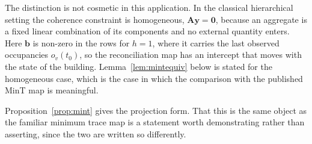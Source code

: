 \documentclass[11pt]{article}
\theoremstyle{plain}
\theoremstyle{definition}
\theoremstyle{remark}
\newcommand{\bA}{\bm{A}}
\newcommand{\by}{\bm{y}}
\newcommand{\bb}{\bm{b}}
\newif\ifrevisionmarkup
\newcommand{\new}[1]{\ifrevisionmarkup\textcolor{revision}{#1}\else#1\fi}
\begin{document}
\new{The distinction is not cosmetic in this application. In the classical hierarchical setting the coherence constraint is homogeneous, $\bA\by=\bm{0}$, because an aggregate is a fixed linear combination of its components and no external quantity enters. Here $\bb$ is non-zero in the rows for $h=1$, where it carries the last observed occupancies $o_v(t_0)$, so the reconciliation map has an intercept that moves with the state of the building. Lemma~\ref{lem:mintequiv} below is stated for the homogeneous case, which is the case in which the comparison with the published MinT map is meaningful.}

Proposition~\ref{prop:mint} gives the projection form. That this is the same object as the familiar minimum trace map is a statement worth demonstrating rather than asserting, since the two are written so differently.
\end{document}
